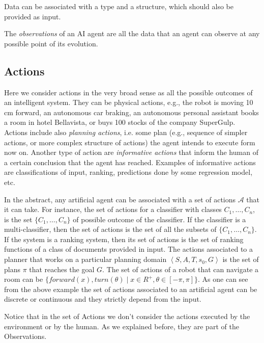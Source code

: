 Data can be associated with a type and a structure, which should
also be provided as input. 

\begin{definition}
The \emph{observations} of an AI agent are all the data that an agent
can observe at any possible point of its evolution.
\end{definition}

\subsection{Actions}
\def\actions{\mathcal{A}} Here we consider actions in the very broad
sense as all the possible outcomes of an intelligent system. They can
be physical actions, e.g., the robot is moving 10 cm forward, an
autonomous car braking, an autonomous personal assistant books a room
in hotel Bellavista, or buys 100 stocks of the company SuperGulp.
Actions include also \emph{planning actions}, i.e.  some plan (e.g.,
sequence of simpler actions, or more complex structure of actions) the
agent intends to execute form now on. Another type of action are
\emph{informative actions} that inform the human of a certain
conclusion that the agent has reached. Examples of informative actions
are classifications of input, ranking, predictions done by some
regression model, etc.

In the abstract, any artificial agent can be associated with a set of
actions $\actions$ that it can take. For instance, the set of actions
for a classifier with classes $C_1,\dots,C_n$, is the set
$\{C_1,\dots,C_n\}$ of possible outcome of the classifier. If the
classifier is a multi-classifier, then the set of actions is the set
of all the subsets of $\{C_1,\dots,C_n\}$. If the system is a ranking
system, then its set of actions is the set of ranking functions
of a class of documents provided in input.
The actions associated to a planner that works on a particular
planning domain $\left<S,A,T,s_0,G\right>$ is the set of plans $\pi$
that reaches the goal $G$. The set of actions of a robot that can
navigate a room can be $\{forward(x),turn(\theta) \mid x \in R^+,
\theta \in [-\pi,\pi]\}$.
As one can see from the above example the set of actions associated to
an artificial agent can be discrete or continuous and they strictly
depend from the input.

Notice that in the set of Actions we don't consider the actions
executed by the environment or by the human. As we explained before,
they are part of the Observations.

